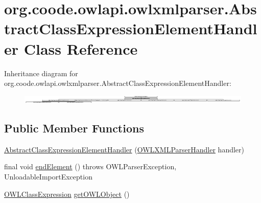 \hypertarget{classorg_1_1coode_1_1owlapi_1_1owlxmlparser_1_1_abstract_class_expression_element_handler}{\section{org.\-coode.\-owlapi.\-owlxmlparser.\-Abstract\-Class\-Expression\-Element\-Handler Class Reference}
\label{classorg_1_1coode_1_1owlapi_1_1owlxmlparser_1_1_abstract_class_expression_element_handler}
}
Inheritance diagram for org.\-coode.\-owlapi.\-owlxmlparser.\-Abstract\-Class\-Expression\-Element\-Handler\-:\begin{figure}[H]
\begin{center}
\leavevmode
\includegraphics[height=0.407125cm]{classorg_1_1coode_1_1owlapi_1_1owlxmlparser_1_1_abstract_class_expression_element_handler}
\end{center}
\end{figure}
\subsection*{Public Member Functions}
\begin{DoxyCompactItemize}
\item 
\hyperlink{classorg_1_1coode_1_1owlapi_1_1owlxmlparser_1_1_abstract_class_expression_element_handler_aa08ffd1146176ffd13cbddab212b3d6b}{Abstract\-Class\-Expression\-Element\-Handler} (\hyperlink{classorg_1_1coode_1_1owlapi_1_1owlxmlparser_1_1_o_w_l_x_m_l_parser_handler}{O\-W\-L\-X\-M\-L\-Parser\-Handler} handler)
\item 
final void \hyperlink{classorg_1_1coode_1_1owlapi_1_1owlxmlparser_1_1_abstract_class_expression_element_handler_a8dba071f966102ad6d762c09595152fb}{end\-Element} ()  throws O\-W\-L\-Parser\-Exception, Unloadable\-Import\-Exception 
\item 
\hyperlink{interfaceorg_1_1semanticweb_1_1owlapi_1_1model_1_1_o_w_l_class_expression}{O\-W\-L\-Class\-Expression} \hyperlink{classorg_1_1coode_1_1owlapi_1_1owlxmlparser_1_1_abstract_class_expression_element_handler_a47c790893fe0fd9d5ef003a9c31923f2}{get\-O\-W\-L\-Object} ()
\end{DoxyCompactItemize}
